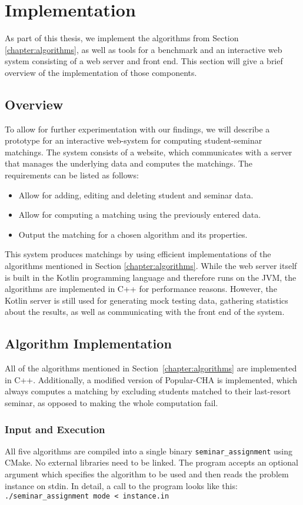 \section{Implementation}

As part of this thesis, we implement the algorithms from Section \ref{chapter:algorithms}, as well as tools for a benchmark and an interactive web system consisting of a web server and front end. This section will give a brief overview of the implementation of those components.

\subsection{Overview}
To allow for further experimentation with our findings, we will describe a prototype for an interactive web-system for computing student-seminar matchings. The system consists of a website, which communicates with a server that manages the underlying data and computes the matchings. The requirements can be listed as follows:
\begin{itemize}
    \item Allow for adding, editing and deleting student and seminar data.
    \item Allow for computing a matching using the previously entered data.
    \item Output the matching for a chosen algorithm and its properties.
\end{itemize}
This system produces matchings by using efficient implementations of the algorithms mentioned in Section \ref{chapter:algorithms}. While the web server itself is built in the Kotlin programming language and therefore runs on the JVM, the algorithms are implemented in C++ for performance reasons. However, the Kotlin server is still used for generating mock testing data, gathering statistics about the results, as well as communicating with the front end of the system.

\subsection{Algorithm Implementation}
All of the algorithms mentioned in \mbox{Section \ref{chapter:algorithms}} are implemented in C++. Additionally, a modified version of Popular-CHA is implemented, which always computes a matching by excluding students matched to their last-resort seminar, as opposed to making the whole computation fail.

\subsubsection{Input and Execution}
All five algorithms are compiled into a single binary \lstinline{seminar_assignment} using CMake. No external libraries need to be linked. The program accepts an optional argument which specifies the algorithm to be used and then reads the problem instance on stdin. In detail, a call to the program looks like this: \lstinline{./seminar_assignment mode < instance.in} 

